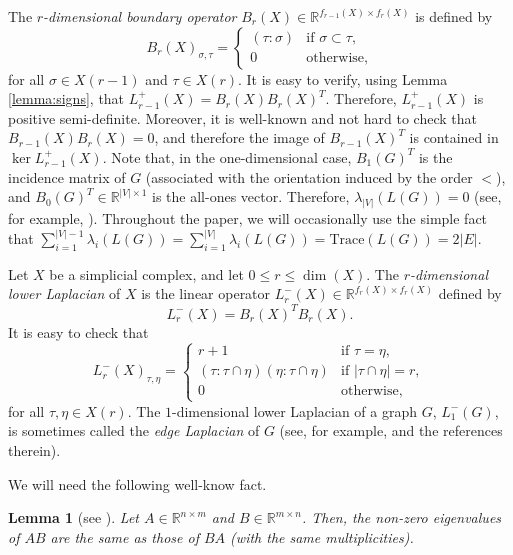 \documentclass[a4paper,11pt]{article}
\theoremstyle{plain}
\newtheorem{lemma}[theorem]{\bf Lemma}
\theoremstyle{definition}
\numberwithin{theorem}{section}
\numberwithin{equation}{section}
\newcommand{\Rea}{{\mathbb R}}
\begin{document}
The \emph{$r$-dimensional boundary operator} $B_{r}(X)\in \Rea^{f_{r-1}(X)\times f_r(X)}$ is defined by
\[
B_r(X)_{\sigma,\tau}= \begin{cases}
                    (\tau:\sigma) & \text{if } \sigma\subset \tau,\\
                    0 & \text{otherwise,}
\end{cases}     
\]
for all $\sigma\in X(r-1)$ and $\tau\in X(r)$. It is easy to verify, using Lemma \ref{lemma:signs}, that $L_{r-1}^{+}(X)=B_r(X) B_r(X)^{T}$. Therefore, $L_{r-1}^{+}(X)$ is positive semi-definite. Moreover, it is well-known and not hard to check that $B_{r-1}(X) B_{r}(X)=0$, and therefore the image of $B_{r-1}(X)^T$ is contained in $\ker L_{r-1}^{+}(X)$. 
Note that, in the one-dimensional case, $B_1(G)^T$ is the incidence matrix of $G$ (associated with the orientation induced by the order $<$), and  $B_{0}(G)^{T}\in \Rea^{|V|\times 1}$ is the all-ones vector. Therefore,  $\lambda_{|V|}(L(G))=0$ (see, for example, \cite{fiedler1973algebraic}). Throughout the paper, we will occasionally use the simple fact that $\sum_{i=1}^{|V|-1}\lambda_i(L(G))=\sum_{i=1}^{|V|}\lambda_i(L(G))=\text{Trace}(L(G))=2|E|$. 

Let $X$ be a simplicial complex, and let $0\le r\le \dim(X)$. 
The \emph{$r$-dimensional lower Laplacian} of $X$ is the linear operator $L^{-}_r(X)\in \Rea^{f_r(X)\times f_r(X)}$ defined by
\[
    L_r^{-}(X)= B_r(X)^T B_r(X).
\]
It is easy to check that
\begin{equation}\label{eq:Lminus_formula}
    L_r^{-}(X)_{\tau,\eta}=\begin{cases}
        r+1 & \text{if } \tau=\eta,\\
        (\tau:\tau\cap \eta)(\eta:\tau\cap \eta) & \text{if } |\tau\cap \eta|=r,\\
        0 & \text{otherwise,}
    \end{cases}     
\end{equation}
for all $\tau,\eta\in X(r)$. The $1$-dimensional lower Laplacian of a graph $G$, $L_{1}^{-}(G)$, is sometimes called the \emph{edge Laplacian} of $G$ (see, for example, \cite{merris1994survey} and the references therein).

We will need the following well-know fact.

\begin{lemma}[see {\cite[Chapter 9, A.1.a]{marshall2011inequalities}}]\label{lemma:AAT}
    Let $A\in \Rea^{n\times m}$ and $B\in \Rea^{m\times n}$. Then, the non-zero eigenvalues of $AB$ are the same as those of $BA$ (with the same multiplicities).
\end{lemma}
\end{document}
